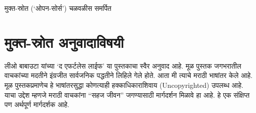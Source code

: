 \begin{dedication}
मुक्त-स्रोत (`ओपन-सोर्स') चळवळीस  समर्पित  
\end{dedication}

\clearpage

\chapter*{मुक्त-स्रोत अनुवादाविषयी}
लीओ बाबाउटा यांच्या `द एफर्टलेस लाईफ' या पुस्तकाचा स्वैर अनुवाद आहे.  मूळ पुस्तक जगभरातील वाचकांच्या मदतीने इंग्रजीत सार्वजनिक पद्धतीने लिहिले गेले होते.  आता मी त्याचे मराठी भाषांतर केले आहे.   मूळ पुस्तकप्रमाणेच  हे भाषांतरसुद्धा  कोणत्याही हक्काधिकाराशिवाय (Uncopyrighted) उपलब्ध आहे.  
याचा उद्देश म्हणजे मराठी वाचकांना ``सहज जीवन'' जगण्यासाठी मार्गदर्शन मिळावे हा आहे.  हे एक संक्षिप्त पण अर्थपूर्ण मार्गदर्शक आहे.

